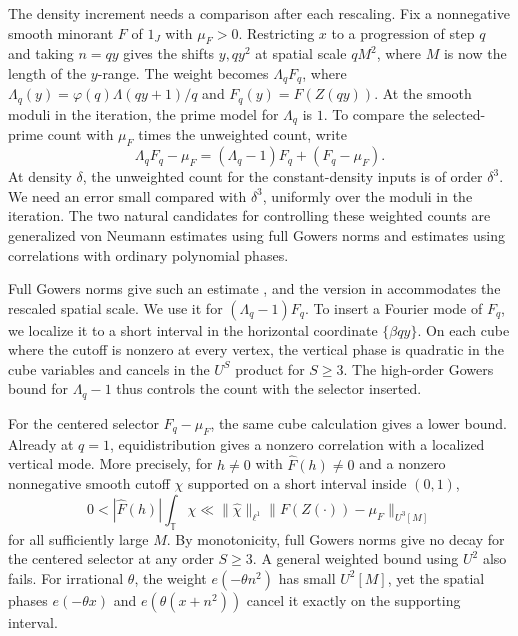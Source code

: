 \documentclass[12pt]{amsart}
\newcommand{\1}{\mathbf 1}
\theoremstyle{definition}
\begin{document}
The density increment needs a comparison after each rescaling.
Fix a nonnegative smooth minorant $F$ of $1_J$ with $\mu_F>0$.
Restricting $x$ to a progression of step $q$ and taking $n=qy$
gives the shifts $y,qy^2$ at spatial scale $qM^2$, where $M$ is
now the length of the $y$-range. The weight becomes $\Lambda_qF_q$,
where $\Lambda_q(y)=\varphi(q)\Lambda(qy+1)/q$ and
$F_q(y)=F(Z(qy))$. At the smooth moduli in the iteration, the
prime model for $\Lambda_q$ is $1$. To compare the selected-prime
count with $\mu_F$ times the unweighted count, write
\[
 \Lambda_qF_q-\mu_F=(\Lambda_q-1)F_q+(F_q-\mu_F).
\]
At density $\delta$, the unweighted count for the constant-density
inputs is of order $\delta^3$. We need an error small compared
with $\delta^3$, uniformly over the moduli in the iteration.
The two natural candidates for controlling these weighted counts
are generalized von Neumann estimates using full Gowers norms
and estimates using correlations with ordinary polynomial phases.

Full Gowers norms give such an estimate
\cite[Theorem~4.2]{Teravainen}, and the version in
\cite[Proposition~3.3]{KMTT} accommodates the rescaled spatial
scale. We use it for $(\Lambda_q-1)F_q$. To insert a Fourier mode
of $F_q$, we localize it to a short interval in the horizontal
coordinate $\{\beta qy\}$. On each cube where the cutoff is nonzero
at every vertex, the vertical phase is quadratic in the cube
variables and cancels in the $U^S$ product for $S\geq3$. The
high-order Gowers bound for $\Lambda_q-1$ thus controls the count
with the selector inserted.

For the centered selector $F_q-\mu_F$, the same cube calculation gives a
lower bound. Already at $q=1$, equidistribution gives a nonzero
correlation with a localized vertical mode. More precisely, for
$h\ne0$ with $\widehat F(h)\ne0$ and a nonzero nonnegative smooth
cutoff $\chi$ supported on a short interval inside $(0,1)$,
\[
 0<|\widehat F(h)|\int_{\mathbb T}\chi
 \ll \|\widehat\chi\|_{\ell^1}
       \|F(Z(\cdot))-\mu_F\|_{U^3[M]}
\]
for all sufficiently large $M$. By monotonicity, full Gowers
norms give no decay for the centered selector at any order
$S\geq3$. A general weighted bound using $U^2$ also fails.
For irrational $\theta$, the weight $e(-\theta n^2)$ has small
$U^2[M]$, yet the spatial phases $e(-\theta x)$ and
$e(\theta(x+n^2))$ cancel it exactly on the supporting interval.
\end{document}
